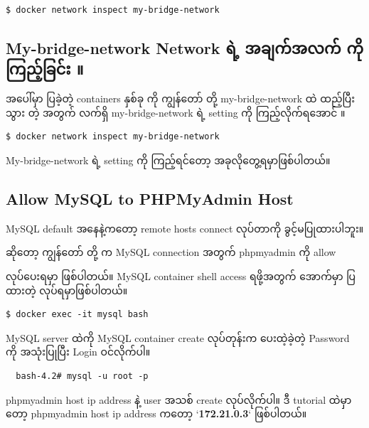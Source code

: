 \begin{verbatim}
$ docker network inspect my-bridge-network
\end{verbatim}

\hypertarget{my-bridge-network-network-ux101bux1032ux1037-ux1021ux1001ux103bux1000ux103aux1021ux101cux1000ux103a-ux1000ux102dux102fux1000ux103cux100aux1037ux103aux1001ux103cux1004ux103aux1038-1}{%
\subsection{My-bridge-network Network ရဲ့ အချက်အလက် ကိုကြည့်ခြင်း
။}\label{my-bridge-network-network-ux101bux1032ux1037-ux1021ux1001ux103bux1000ux103aux1021ux101cux1000ux103a-ux1000ux102dux102fux1000ux103cux100aux1037ux103aux1001ux103cux1004ux103aux1038-1}}

အပေါ်မှာ ပြခဲ့တဲ့ containers နှစ်ခု ကို ကျွန်တော် တို့ my-bridge-network
ထဲ ထည့်ပြီးသွား တဲ့ အတွက် လက်ရှိ my-bridge-network ရဲ့ setting ကို
ကြည့်လိုက်ရအောင် ။

\begin{verbatim}
$ docker network inspect my-bridge-network
\end{verbatim}

My-bridge-network ရဲ့ setting ကို ကြည့်ရင်တော့ အခုလိုတွေ့ရမှာဖြစ်ပါတယ်။

\hypertarget{allow-mysql-to-phpmyadmin-host-1}{%
\subsection{Allow MySQL to PHPMyAdmin
Host}\label{allow-mysql-to-phpmyadmin-host-1}}

MySQL default အနေနဲ့ကတော့ remote hosts connect လုပ်တာကို
ခွင့်မပြုထားပါဘူး။

ဆိုတော့ ကျွန်တော် တို့ က MySQL connection အတွက် phpmyadmin ကို allow

လုပ်ပေးရမှာ ဖြစ်ပါတယ်။ MySQL container shell access ရဖို့အတွက် အောက်မှာ
ပြထားတဲ့ လုပ်ရမှာဖြစ်ပါတယ်။

\begin{verbatim}
$ docker exec -it mysql bash
\end{verbatim}

MySQL server ထဲကို MySQL container create လုပ်တုန်းက ပေးထဲ့ခဲ့တဲ့
Password ကို အသုံးပြုပြီး Login ဝင်လိုက်ပါ။

\begin{verbatim}
  bash-4.2# mysql -u root -p
\end{verbatim}

phpmyadmin host ip address နဲ့ user အသစ် create လုပ်လိုက်ပါ။ ဒီ tutorial
ထဲမှာတော့ phpmyadmin host ip address ကတော့ `\textbf{172.21.0.3}`
ဖြစ်ပါတယ်။

